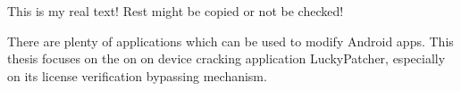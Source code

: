 This is my real text! Rest might be copied or not be checked!

%
\cite{munteanLicensing}
%
There are plenty of applications which can be used to modify Android apps. This thesis focuses on the on on device cracking application LuckyPatcher, especially on its license verification bypassing mechanism.
